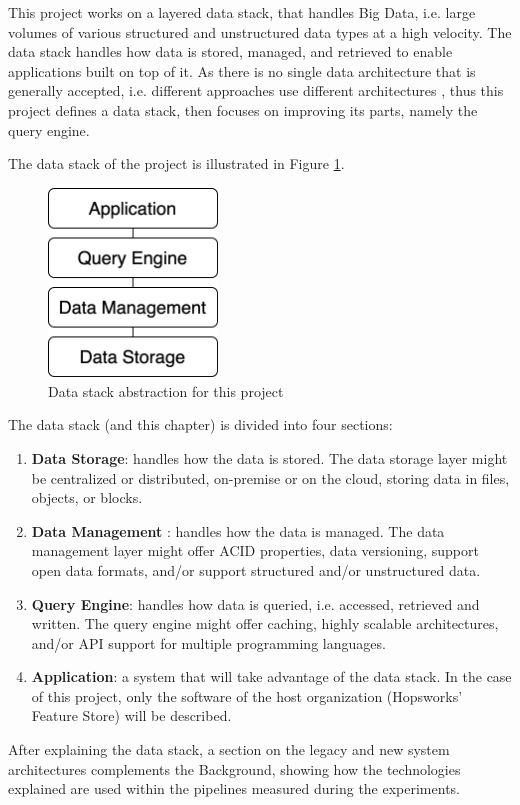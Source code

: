 This project works on a layered data stack, that handles Big Data, i.e. large volumes of various structured and unstructured data types at a high velocity. The data stack handles how data is stored, managed, and retrieved to enable applications built on top of it. 
As there is no single data architecture that is generally accepted, i.e. different approaches use different architectures \cite{framptonCompleteGuideOpen2018,sakrBigDataProcessing2017}, thus this project defines a data stack, then focuses on improving its parts, namely the query engine. 

The data stack of the project is illustrated in Figure \ref{fig:data_stack}.

\begin{figure}[!ht]
    \begin{center}
      \includegraphics[width=0.4\textwidth]{figures/2-background/data_stack.png}
    \end{center}
    \caption{Data stack abstraction for this project}
    \label{fig:data_stack}
\end{figure}

The data stack (and this chapter) is divided into four sections:
\begin{enumerate}
    \item \textbf{Data Storage}: handles how the data is stored. The data storage layer might be centralized or distributed, on-premise or on the cloud, storing data in files, objects, or blocks.
    \item \textbf{Data Management} : handles how the data is managed. The data management layer might offer \gls{ACID} properties, data versioning, support open data formats, and/or support structured and/or unstructured data.
    \item \textbf{Query Engine}: handles how data is queried, i.e. accessed, retrieved and written. The query engine might offer caching, highly scalable architectures, and/or \gls{API} support for multiple programming languages.
    \item \textbf{Application}: a system that will take advantage of the data stack. In the case of this project, only the software of the host organization (Hopsworks' Feature Store) will be described. 
\end{enumerate}
After explaining the data stack, a section on the legacy and new system architectures complements the Background, showing how the technologies explained are used within the pipelines measured during the experiments.
